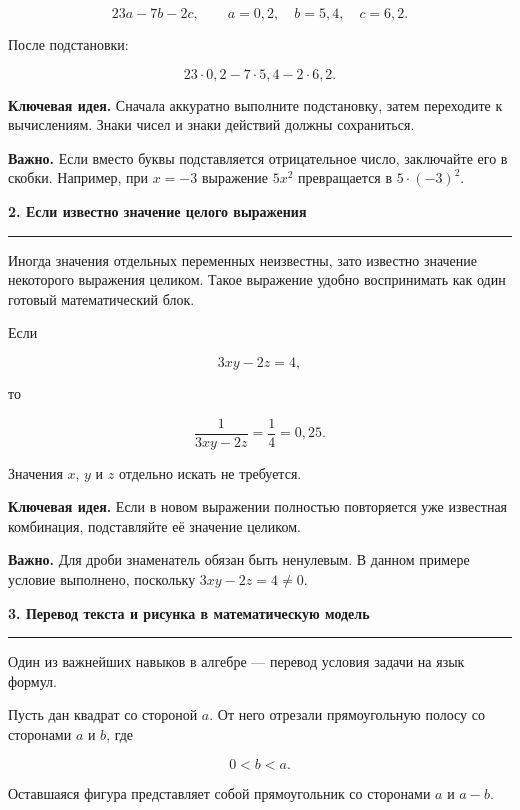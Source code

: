 \documentclass[a4paper,12pt]{article}
\newcommand{\sectiontitle}[1]{%
  \vspace{0.6em}%
  {\Large\bfseries\textcolor{darkaccent}{#1}}\par
  \vspace{0.25em}%
  {\color{linegray}\rule{\linewidth}{0.6pt}}\par
  \vspace{0.5em}%
}
\newcommand{\keyidea}[1]{%
  \textbf{\textcolor{darkaccent}{Ключевая идея.}} #1
}
\newcommand{\warning}[1]{%
  \textbf{\textcolor{accent}{Важно.}} #1
}
\begin{document}
\[
23a-7b-2c,
\qquad
a=0{,}2,\quad b=5{,}4,\quad c=6{,}2.
\]

После подстановки:

\[
23\cdot 0{,}2
-
7\cdot 5{,}4
-
2\cdot 6{,}2.
\]

\keyidea{
Сначала аккуратно выполните подстановку, затем переходите к вычислениям.
Знаки чисел и знаки действий должны сохраниться.
}

\warning{
Если вместо буквы подставляется отрицательное число, заключайте его в скобки.
Например, при $x=-3$ выражение $5x^2$ превращается в
$5\cdot(-3)^2$.
}


\sectiontitle{2. Если известно значение целого выражения}

Иногда значения отдельных переменных неизвестны, зато известно значение
некоторого выражения целиком. Такое выражение удобно воспринимать как один
готовый математический блок.

Если

\[
3xy-2z=4,
\]

то

\[
\frac{1}{3xy-2z}
=
\frac14
=
0{,}25.
\]

Значения $x$, $y$ и $z$ отдельно искать не требуется.

\keyidea{
Если в новом выражении полностью повторяется уже известная комбинация,
подставляйте её значение целиком.
}

\warning{
Для дроби знаменатель обязан быть ненулевым.
В данном примере условие выполнено, поскольку
$3xy-2z=4\ne0$.
}


\sectiontitle{3. Перевод текста и рисунка в математическую модель}

Один из важнейших навыков в алгебре --- перевод условия задачи на язык формул.

Пусть дан квадрат со стороной $a$.
От него отрезали прямоугольную полосу со сторонами $a$ и $b$, где

\[
0<b<a.
\]

Оставшаяся фигура представляет собой прямоугольник со сторонами
$a$ и $a-b$.
\end{document}
